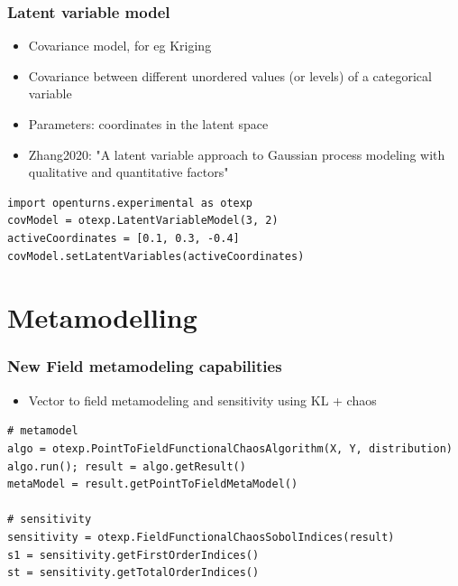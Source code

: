 \documentclass[aspectratio=169]{beamer}
\begin{document}

\begin{frame}[containsverbatim]
\frametitle{Latent variable model}

\begin{itemize}
\item Covariance model, for eg Kriging
\item Covariance between different unordered values (or levels) of a categorical variable
\item Parameters: coordinates in the latent space
\item Zhang2020: "A latent variable approach to Gaussian process modeling with qualitative and quantitative factors"
\end{itemize}

\vspace{30pt}

\begin{small}
\begin{lstlisting}
import openturns.experimental as otexp
covModel = otexp.LatentVariableModel(3, 2)
activeCoordinates = [0.1, 0.3, -0.4]
covModel.setLatentVariables(activeCoordinates)
\end{lstlisting}
\end{small}

\end{frame}


\section{Metamodelling}

\begin{frame}[containsverbatim]
\frametitle{New Field metamodeling capabilities}
\begin{itemize}
\item Vector to field metamodeling and sensitivity using KL + chaos
\end{itemize}


\begin{small}
\begin{lstlisting}
# metamodel
algo = otexp.PointToFieldFunctionalChaosAlgorithm(X, Y, distribution)
algo.run(); result = algo.getResult()
metaModel = result.getPointToFieldMetaModel()

# sensitivity
sensitivity = otexp.FieldFunctionalChaosSobolIndices(result)
s1 = sensitivity.getFirstOrderIndices()
st = sensitivity.getTotalOrderIndices()
\end{lstlisting}
\end{small}


\end{frame}
\end{document}
